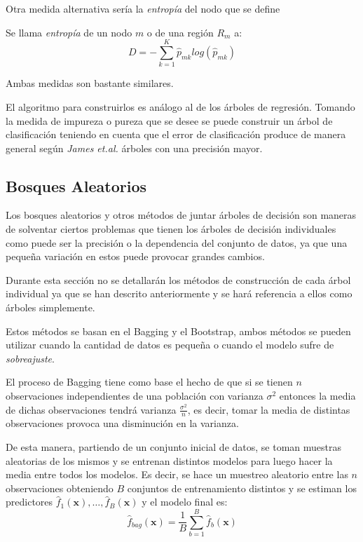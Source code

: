 \noindent Otra medida alternativa sería la 
\textit{entropía} del nodo que se define 
\begin{defi}
Se llama \textit{entropía} de un nodo $m$ o de una región $R_m$ a:
\begin{equation}
D= - \sum_{k=1}^K \hat{p}_{mk} log(\hat{p}_{mk})
\end{equation}
\end{defi}
\noindent Ambas medidas son bastante similares. 

\noindent El algoritmo para construirlos es análogo al de los árboles de regresión. Tomando la medida de impureza o pureza que se desee se puede construir un árbol de clasificación teniendo en cuenta que el error de clasificación produce de manera general según \textit{James et.al.} \cite{James 2013} árboles con una precisión mayor. 




\subsection{Bosques Aleatorios}

\noindent Los bosques aleatorios y otros métodos de juntar árboles de decisión son maneras de solventar ciertos problemas que tienen los árboles de decisión individuales como puede ser la precisión o la dependencia del conjunto de datos, ya que una pequeña variación en estos puede provocar grandes cambios. 


\noindent Durante esta sección no se detallarán los métodos de construcción de cada árbol individual ya que se han descrito anteriormente y se hará referencia a ellos como árboles simplemente. 

\noindent Estos métodos se basan en el  Bagging y el Bootstrap, ambos métodos se pueden utilizar cuando la cantidad de datos es pequeña o cuando el modelo sufre de \textit{sobreajuste}. 

\noindent El proceso de Bagging tiene como base el hecho de que si se tienen $n$ observaciones independientes de una población con varianza $\sigma^2$ entonces la media de dichas observaciones tendrá varianza $\frac{\sigma^2}{n}$, es decir, tomar la media de distintas observaciones provoca una disminución en la varianza. 

\noindent De esta manera, partiendo de un conjunto inicial de datos, se toman muestras aleatorias de los mismos y se entrenan distintos modelos para luego hacer la media entre todos los modelos. Es decir, se hace un muestreo aleatorio entre las $n$ observaciones obteniendo $B$ conjuntos de entrenamiento distintos y se estiman los predictores $\hat{f}_1(\textbf{x}),\ldots, \hat{f}_B(\textbf{x})$ y el modelo final es:
\begin{equation}
\hat{f}_{bag}(\textbf{x})=\dfrac{1}{B}\sum_{b=1}^B \hat{f}_b(\textbf{x})
\end{equation}


